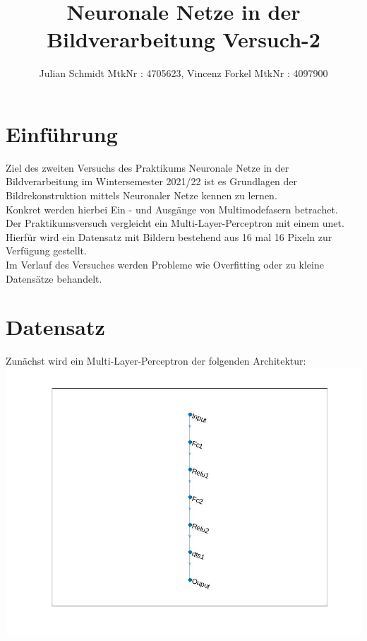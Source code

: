 \documentclass[8pt,a4paper]{article}
\title{Neuronale Netze in der Bildverarbeitung Versuch-2}
\author{Julian Schmidt MtkNr : 4705623, Vincenz Forkel MtkNr : 4097900}
\begin{document}
\maketitle

\section{Einführung}

Ziel des zweiten Versuchs des Praktikums Neuronale Netze in der Bildverarbeitung im Wintersemester 2021/22 ist es Grundlagen der Bildrekonstruktion mittels Neuronaler Netze kennen zu lernen.\\
Konkret werden hierbei Ein - und Ausgänge von Multimodefasern betrachet.\\
Der Praktikumsversuch vergleicht ein Multi-Layer-Perceptron mit einem unet.\\



Hierfür wird ein Datensatz mit Bildern bestehend aus 16 mal 16 Pixeln zur Verfügung gestellt.\\



Im Verlauf des Versuches werden Probleme wie Overfitting oder zu kleine Datensätze behandelt.
\newpage

\section{Datensatz}

Zunächst wird ein Multi-Layer-Perceptron der folgenden Architektur:\\

\includegraphics[scale=0.2]{layers.jpg}
\end{document}
